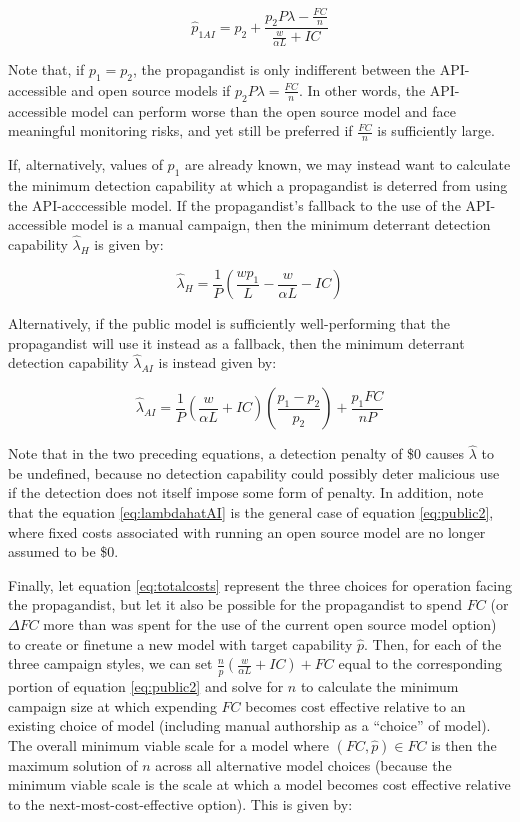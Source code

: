 \documentclass{article}
\begin{document}
\begin{equation}
  \hat{p}_{1AI} = p_2 + \frac{p_2 P \lambda - \frac{FC}{n}}{\frac{w}{\alpha L} + IC} 
\end{equation}

Note that, if $p_1 = p_2$, the propagandist is only indifferent between the API-accessible and open source models if $p_2 P \lambda = \frac{FC}{n}$. In other words, the API-accessible model can perform worse than the open source model and face meaningful monitoring risks, and yet still be preferred if $\frac{FC}{n}$ is sufficiently large.  

If, alternatively, values of $p_1$ are already known, we may instead want to calculate the minimum detection capability at which a propagandist is deterred from using the API-acccessible model. If the propagandist's fallback to the use of the API-accessible model is a manual campaign, then the minimum deterrant detection capability $\hat{\lambda}_H$ is given by:  

\begin{equation}
  \hat{\lambda}_{H} = \frac{1}{P} \left( \frac{w p_1}{L} - \frac{w}{\alpha L} - IC \right)
\end{equation}

Alternatively, if the public model is sufficiently well-performing that the propagandist will use it instead as a fallback, then the minimum deterrant detection capability $\hat{\lambda}_{AI}$ is instead given by:

\begin{equation}
  \label{eq:lambdahatAI}
  \hat{\lambda}_{AI} = \frac{1}{P} \left( \frac{w}{\alpha L} + IC \right) \left( \frac{p_1 - p_2}{p_2} \right) + \frac{p_1 FC}{n P}
\end{equation}

Note that in the two preceding equations, a detection penalty of \$0 causes $\hat{\lambda}$ to be undefined, because no detection capability could possibly deter malicious use if the detection does not itself impose some form of penalty. In addition, note that the equation \ref{eq:lambdahatAI} is the general case of equation \ref{eq:public2}, where fixed costs associated with running an open source model are no longer assumed to be \$0.

Finally, let equation \ref{eq:totalcosts} represent the three choices for operation facing the propagandist, but let it also be possible for the propagandist to spend $FC$ (or $\Delta FC$ more than was spent for the use of the current open source model option) to create or finetune a new model with target capability $\hat{p}$. Then, for each of the three campaign styles, we can set $\frac{n}{\hat{p}} \left( \frac{w}{\alpha L} + IC \right) + FC$ equal to the corresponding portion of equation \ref{eq:public2} and solve for $n$ to calculate the minimum campaign size at which expending $FC$ becomes cost effective relative to an existing choice of model (including manual authorship as a ``choice'' of model). The overall minimum viable scale for a model where $(FC, \hat{p}) \in FC$ is then the maximum solution of $n$ across all alternative model choices (because the minimum viable scale is the scale at which a model becomes cost effective relative to the next-most-cost-effective option). This is given by:
\end{document}
